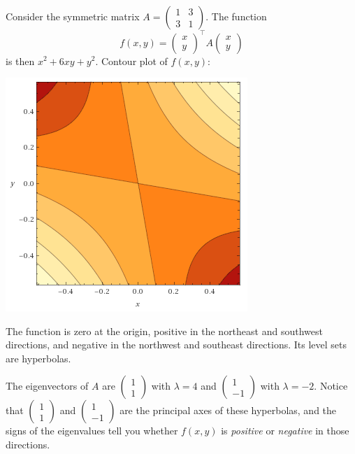 \documentclass[10pt]{amsart}
\theoremstyle{mythm}
\theoremstyle{definition}
\theoremstyle{myrmk}
\begin{document}
	 Consider the symmetric matrix $A = \begin{pmatrix}
	1 & 3 \\ 3 & 1
	\end{pmatrix}$. The function 
	\[
	f(x, y) = \begin{pmatrix}
	x \\ y 
	\end{pmatrix}^\top A \begin{pmatrix}
	x \\ y 
	\end{pmatrix}
	\]
	is then $x^2 + 6xy + y^2$. Contour plot of $f(x, y)$: 
	\begin{center}
		\includegraphics{rec10-pic1} 
	\end{center}
	The function is zero at the origin, positive in the northeast and southwest directions, and negative in the northwest and southeast directions. Its level sets are hyperbolas. 
	
	The eigenvectors of $A$ are $\begin{pmatrix}
	1 \\ 1 
	\end{pmatrix}$ with $\lambda = 4$ and $\begin{pmatrix}
	1 \\ -1
	\end{pmatrix}$ with $\lambda = -2$. Notice that $\begin{pmatrix}
	1 \\ 1 
	\end{pmatrix}$ and $\begin{pmatrix}
	1 \\ -1
	\end{pmatrix}$ are the principal axes of these hyperbolas, and the signs of the eigenvalues tell you whether $f(x, y)$ is \emph{positive} or \emph{negative} in those directions. 
	
\end{document}
